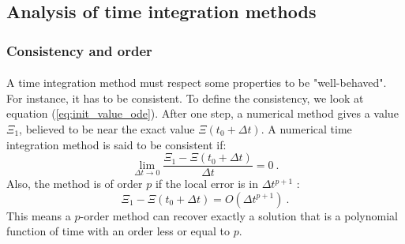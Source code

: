     \subsection{Analysis of time integration methods}

      \subsubsection{Consistency and order}

        \paragraph{}
        A time integration method must respect some properties to be "well-behaved".
        For instance, it has to be consistent.
        To define the consistency, we look at equation (\ref{eq:init_value_ode}).
        After one step, a numerical method gives a value $\Xi_1$, believed to be near the exact value $\Xi\left(t_0 + \Delta t\right)$.
        A numerical time integration method is said to be consistent if:
        \begin{equation}
          \lim_{\Delta t \rightarrow 0} \frac{\Xi_1 - \Xi\left(t_0 + \Delta t\right)}{\Delta t} = 0 \ .
        \end{equation}
        Also, the method is of order $p$ if the local error is in $\Delta t^{p+1}$ \cite{Iserles2008}:
        \begin{equation}
          \Xi_1 - \Xi\left(t_0 + \Delta t\right) = O\left(\Delta t^{p+1}\right) \ .
        \end{equation}
        This means a $p$-order method can recover exactly a solution that is a polynomial function of time with an order less or equal to $p$.

